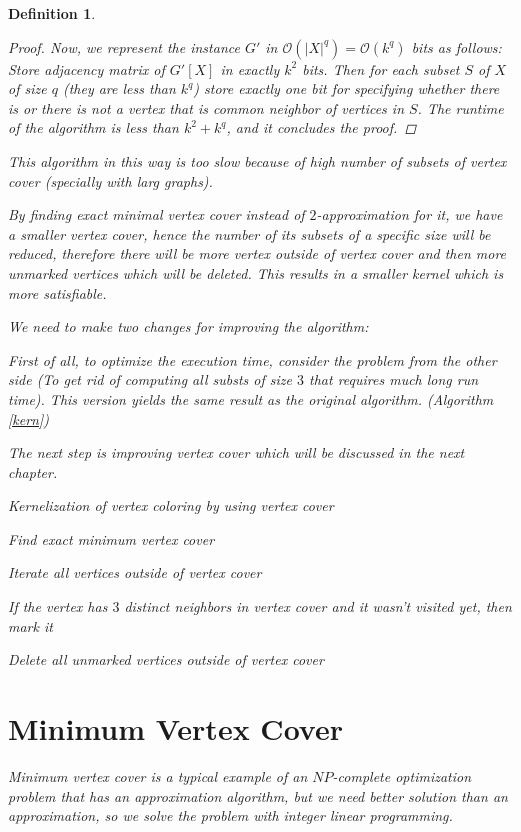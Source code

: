 \documentclass[12pt]{article}
\theoremstyle{slplain}
\newtheorem{defi}{Definition}
\begin{document}
\begin{defi}
\begin{proof}
Now, we represent the instance $G'$ in $\mathcal{O}(|X|^q) = \mathcal{O}(k^q)$ bits as follows: Store 
adjacency matrix of $G'[X]$ in exactly $k^2$ bits. Then for each subset $S$ of $X$ 
of size $q$ (they are less than $k^q$) store exactly one bit for specifying whether 
there is or there is not a vertex that is common neighbor of vertices in $S$. The 
runtime of the algorithm is less than $k^2 + k^q$, and it concludes the proof.
\end{proof}


This algorithm in this way is too slow because of high number of subsets of vertex cover (specially with larg graphs). 

By finding exact minimal vertex cover instead of $2$-approximation for it, we have a smaller vertex cover, hence the number of its subsets of a specific size will be reduced, therefore there will be more vertex outside of vertex cover and then more unmarked vertices which will be deleted. This results in a smaller kernel which is more satisfiable.

We need to make two changes for improving the algorithm:

First of all, to optimize the execution time, consider the problem from the
other side (To get rid of computing all substs of size $3$ that requires much
long run time). This version yields the same result as the original algorithm. (Algorithm \ref{kern})

The next step is improving vertex cover which will be discussed in the next chapter.

\newpage

\begin{algorithm}[H]
\SetAlgoLined
\DontPrintSemicolon
  \caption{Kernelization of vertex coloring by using vertex cover}{\label{kern}}

Find exact minimum vertex cover\;

Iterate all vertices outside of vertex cover\;

If the vertex has $3$ distinct neighbors in vertex cover and it wasn't
visited yet, then mark it\;

Delete all unmarked vertices outside of vertex cover\;
\end{algorithm}

\vspace{2cm}




\newpage
\section{Minimum Vertex Cover}{\label{vertex_cover}}
Minimum vertex cover is a typical example of an $NP$-complete optimization problem that has an approximation algorithm, but we need better solution than an approximation, so we solve the problem with integer linear programming.


\end{defi}
\end{document}
